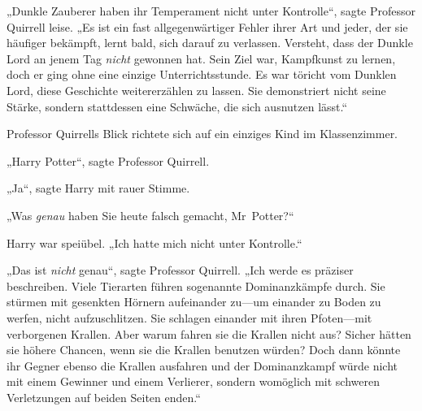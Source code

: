 „Dunkle Zauberer haben ihr Temperament nicht unter Kontrolle“, sagte Professor Quirrell leise. „Es ist ein fast allgegenwärtiger Fehler ihrer Art und jeder, der sie häufiger bekämpft, lernt bald, sich darauf zu verlassen. Versteht, dass der Dunkle Lord an jenem Tag \emph{nicht} gewonnen hat. Sein Ziel war, Kampfkunst zu lernen, doch er ging ohne eine einzige Unterrichtsstunde. Es war töricht vom Dunklen Lord, diese Geschichte weitererzählen zu lassen. Sie demonstriert nicht seine Stärke, sondern stattdessen eine Schwäche, die sich ausnutzen lässt.“

Professor Quirrells Blick richtete sich auf ein einziges Kind im Klassenzimmer.

„Harry Potter“, sagte Professor Quirrell.

„Ja“, sagte Harry mit rauer Stimme.

„Was \emph{genau} haben Sie heute falsch gemacht, Mr~Potter?“

Harry war speiübel. „Ich hatte mich nicht unter Kontrolle.“

„Das ist \emph{nicht} genau“, sagte Professor Quirrell. „Ich werde es präziser beschreiben. Viele Tierarten führen sogenannte Dominanzkämpfe durch. Sie stürmen mit gesenkten Hörnern aufeinander zu—um einander zu Boden zu werfen, nicht aufzuschlitzen. Sie schlagen einander mit ihren Pfoten—mit verborgenen Krallen. Aber warum fahren sie die Krallen nicht aus? Sicher hätten sie höhere Chancen, wenn sie die Krallen benutzen würden? Doch dann könnte ihr Gegner ebenso die Krallen ausfahren und der Dominanzkampf würde nicht mit einem Gewinner und einem Verlierer, sondern womöglich mit schweren Verletzungen auf beiden Seiten enden.“

